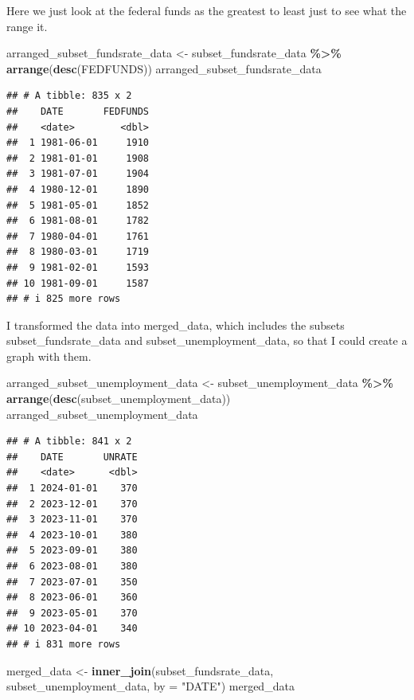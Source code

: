 \documentclass[
]{article}
\newenvironment{Shaded}{\begin{snugshade}}{\end{snugshade}}
\newcommand{\AttributeTok}[1]{\textcolor[rgb]{0.13,0.29,0.53}{#1}}
\newcommand{\FunctionTok}[1]{\textcolor[rgb]{0.13,0.29,0.53}{\textbf{#1}}}
\newcommand{\NormalTok}[1]{#1}
\newcommand{\OtherTok}[1]{\textcolor[rgb]{0.56,0.35,0.01}{#1}}
\newcommand{\SpecialCharTok}[1]{\textcolor[rgb]{0.81,0.36,0.00}{\textbf{#1}}}
\newcommand{\StringTok}[1]{\textcolor[rgb]{0.31,0.60,0.02}{#1}}
\begin{document}
Here we just look at the federal funds as the greatest to least just to
see what the range it.

\begin{Shaded}
\begin{Highlighting}[]
\NormalTok{arranged\_subset\_fundsrate\_data }\OtherTok{\textless{}{-}}\NormalTok{ subset\_fundsrate\_data }\SpecialCharTok{\%\textgreater{}\%} \FunctionTok{arrange}\NormalTok{(}\FunctionTok{desc}\NormalTok{(FEDFUNDS))}
\NormalTok{arranged\_subset\_fundsrate\_data}
\end{Highlighting}
\end{Shaded}

\begin{verbatim}
## # A tibble: 835 x 2
##    DATE       FEDFUNDS
##    <date>        <dbl>
##  1 1981-06-01     1910
##  2 1981-01-01     1908
##  3 1981-07-01     1904
##  4 1980-12-01     1890
##  5 1981-05-01     1852
##  6 1981-08-01     1782
##  7 1980-04-01     1761
##  8 1980-03-01     1719
##  9 1981-02-01     1593
## 10 1981-09-01     1587
## # i 825 more rows
\end{verbatim}

I transformed the data into merged\_data, which includes the subsets
subset\_fundsrate\_data and subset\_unemployment\_data, so that I could
create a graph with them.

\begin{Shaded}
\begin{Highlighting}[]
\NormalTok{arranged\_subset\_unemployment\_data }\OtherTok{\textless{}{-}}\NormalTok{ subset\_unemployment\_data }\SpecialCharTok{\%\textgreater{}\%} \FunctionTok{arrange}\NormalTok{(}\FunctionTok{desc}\NormalTok{(subset\_unemployment\_data))}
\NormalTok{arranged\_subset\_unemployment\_data}
\end{Highlighting}
\end{Shaded}

\begin{verbatim}
## # A tibble: 841 x 2
##    DATE       UNRATE
##    <date>      <dbl>
##  1 2024-01-01    370
##  2 2023-12-01    370
##  3 2023-11-01    370
##  4 2023-10-01    380
##  5 2023-09-01    380
##  6 2023-08-01    380
##  7 2023-07-01    350
##  8 2023-06-01    360
##  9 2023-05-01    370
## 10 2023-04-01    340
## # i 831 more rows
\end{verbatim}

\begin{Shaded}
\begin{Highlighting}[]
\NormalTok{merged\_data }\OtherTok{\textless{}{-}} \FunctionTok{inner\_join}\NormalTok{(subset\_fundsrate\_data, subset\_unemployment\_data, }\AttributeTok{by =} \StringTok{"DATE"}\NormalTok{)}
\NormalTok{merged\_data}
\end{Highlighting}
\end{Shaded}
\end{document}
